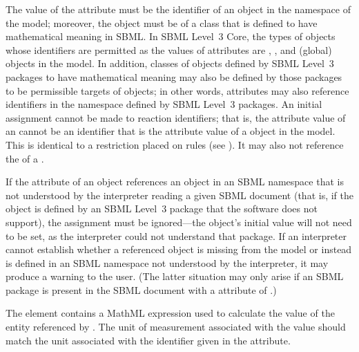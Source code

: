 \begin{blockChanged}
The value of the  attribute must be the identifier of an object in the  namespace of the model; moreover, the object must be of a class that is defined to have mathematical meaning in SBML.  In SBML Level~3 Core, the types of objects whose identifiers are permitted as the values of \InitialAssignment {} attributes are \Compartment, \Species, \SpeciesReference and (global) \Parameter objects in the model.  In addition, classes of objects defined by SBML Level~3 packages to have mathematical meaning may also be defined by those packages to be permissible targets of \InitialAssignment objects; in other words, \InitialAssignment {} attributes may also reference identifiers in the  namespace defined by SBML Level~3 packages.  An initial assignment cannot be made to reaction identifiers; that is, the  attribute value of an \InitialAssignment cannot be an identifier that is the  attribute value of a \Reaction object in the model.  This is identical to a restriction placed on rules (see ).  It may also not reference the  of a \FunctionDefinition.

If the  attribute of an \InitialAssignment object references an object in an SBML namespace that is not understood by the interpreter reading a given SBML document (that is, if the object is defined by an SBML Level~3 package that the software does not support), the assignment must be ignored---the object's initial value will not need to be set, as the interpreter could not understand that package.  If an interpreter cannot establish whether a referenced object is missing from the model or instead is defined in an SBML namespace not understood by the interpreter, it may produce a warning to the user.  (The latter situation may only arise if an SBML package is present in the SBML document with a  attribute of .)

\end{blockChanged}



The  element contains a MathML expression used to
calculate the value of the entity referenced by .
The unit of measurement associated with the value should match the
unit associated with the identifier given in the 
attribute.



